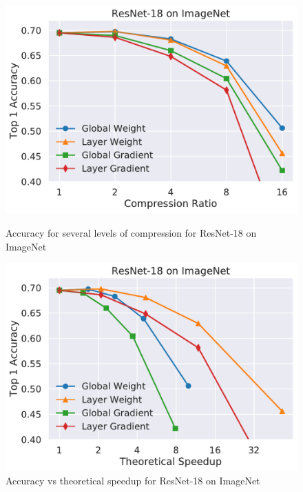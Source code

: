 \begin{figure}
\begin{minipage}[b]{.45\textwidth}
\centering
\includegraphics[width=\linewidth]{shrinkbench/resnet18_ImageNet_comp}
\caption{Accuracy for several levels of compression for ResNet-18 on ImageNet}
\end{minipage}
\hfill
\begin{minipage}[b]{.45\textwidth}
\centering
\includegraphics[width=\linewidth]{shrinkbench/resnet18_ImageNet_flops}
\caption{Accuracy vs theoretical speedup for ResNet-18 on ImageNet}
\end{minipage}
\end{figure}


